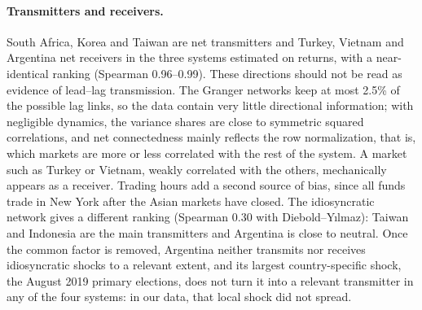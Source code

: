 \paragraph{Transmitters and receivers.}
South Africa, Korea and Taiwan are net transmitters and Turkey, Vietnam and Argentina net receivers in the three systems estimated on returns, with a near-identical ranking (Spearman 0.96--0.99). These directions should not be read as evidence of lead--lag transmission. The Granger networks keep at most 2.5\% of the possible lag links, so the data contain very little directional information; with negligible dynamics, the variance shares are close to symmetric squared correlations, and net connectedness mainly reflects the row normalization, that is, which markets are more or less correlated with the rest of the system. A market such as Turkey or Vietnam, weakly correlated with the others, mechanically appears as a receiver. Trading hours add a second source of bias, since all funds trade in New York after the Asian markets have closed. The idiosyncratic network gives a different ranking (Spearman 0.30 with Diebold--Y{\i}lmaz): Taiwan and Indonesia are the main transmitters and Argentina is close to neutral. Once the common factor is removed, Argentina neither transmits nor receives idiosyncratic shocks to a relevant extent, and its largest country-specific shock, the August 2019 primary elections, does not turn it into a relevant transmitter in any of the four systems: in our data, that local shock did not spread.

